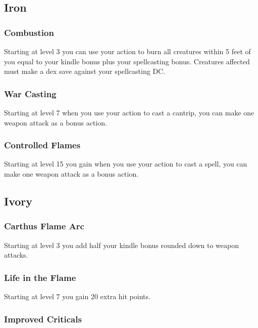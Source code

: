 \subsection{Iron}

\subsubsection{Combustion}

Starting at level 3 you can use your action to burn all creatures within 5 feet of you equal to your kindle bonus plus your spellcasting bonus. Creatures affected must make a dex save against your spellcasting DC.

\subsubsection{War Casting}

Starting at level 7 when you use your action to cast a cantrip, you can make one weapon attack as a bonus action.

\subsubsection{Controlled Flames}

Starting at level 15 you gain when you use your action to cast a spell, you can make one weapon attack as a bonus action.

\subsection{Ivory}

\subsubsection{Carthus Flame Arc}

Starting at level 3 you add half your kindle bonus rounded down to weapon attacks.

\subsubsection{Life in the Flame}

Starting at level 7 you gain 20 extra hit points.

\subsubsection{Improved Criticals}

